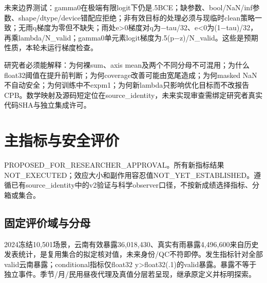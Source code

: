 \documentclass[UTF8,fontset=fandol,10pt]{ctexart}
\begin{document}
未来边界测试：gamma0在极端有限logit下仍是.5BCE；缺参数、bool/\allowbreak{}NaN/\allowbreak{}inf参数、shape/\allowbreak{}dtype/\allowbreak{}device错配应拒绝；非有效目标的处理必须与现临时clean策略一致；无雨q梯度为零但不缺失；雨处e>0梯度对q为\(-\)tau/\allowbreak{}32、e<0为(1\(-\)tau)/\allowbreak{}32，再乘lambda/\allowbreak{}N\_\allowbreak{}valid；gamma0单元素logit梯度为.5(p\(-\)z)/\allowbreak{}N\_\allowbreak{}valid。这些是预期性质，本轮未运行梯度检查。

研究者必须能解释：为何裸sum、axis mean及两个不同分母不可混用；为什么float32阈值在提升前判断；为何coverage改善可能由宽尾造成；为何masked NaN不自动安全；为何训练中不expm1；为何新lambda只影响优化目标而不改报告CPB。数学映射及源码短定位在source\_\allowbreak{}identity，未来实现审查需绑定研究者真实代码SHA与独立集成许可。
\clearpage\section{主指标与安全评价}

PROPOSED\_\allowbreak{}FOR\_\allowbreak{}RESEARCHER\_\allowbreak{}APPROVAL。所有新指标结果NOT\_\allowbreak{}EXECUTED；效应大小和副作用容忍值NOT\_\allowbreak{}YET\_\allowbreak{}ESTABLISHED。遵循已有source\_\allowbreak{}identity中的v2验证与科学observer口径，不按新成绩选择指标、分箱或集合。

\subsection{固定评价域与分母}

2024冻结10,501场景，云南有效暴露36,018,430、真实有雨暴露4,496,600来自历史发表统计，是复用集合的拟定核对值，未来身份/\allowbreak{}QC不符即停。发生指标针对全部valid云南暴露；conditional指标仅float32 y>float32(.1)的valid暴露。暴露不等于独立事件。季节/\allowbreak{}月/\allowbreak{}民用昼夜代理及真值分层若呈现，继承原定义并标明探索。
\end{document}

